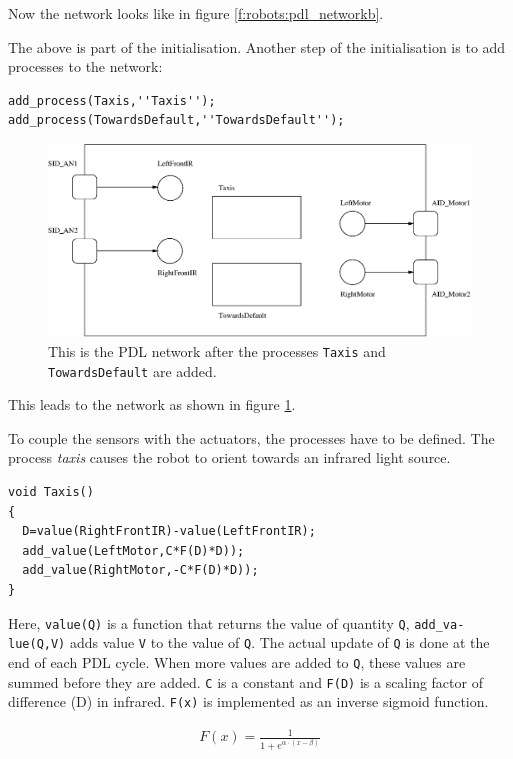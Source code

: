 Now the network looks like in figure \ref{f:robots:pdl_networkb}.

The above is part of the initialisation. Another step of the initialisation is to add processes to the network:


{\footnotesize\begin{verbatim}
add_process(Taxis,''Taxis'');
add_process(TowardsDefault,''TowardsDefault'');
\end{verbatim}}

\begin{figure}
\centerline{\includegraphics[width=12cm]{robots//pdl_networkc.eps}}
\caption{This is the PDL network after the processes \texttt{Taxis} and \texttt{TowardsDefault} are added.}
\label{f:robots:pdl_networkc}
\end{figure}


This leads to the network as shown in figure \ref{f:robots:pdl_networkc}. 

To couple the sensors with the actuators, the processes have to be defined. The process {\em taxis} causes the robot to orient towards an infrared light source.


{\footnotesize\begin{verbatim}
void Taxis()
{
  D=value(RightFrontIR)-value(LeftFrontIR);
  add_value(LeftMotor,C*F(D)*D));
  add_value(RightMotor,-C*F(D)*D));
}
\end{verbatim}}


Here, \texttt{value(Q)} is a function that returns the value of quantity \texttt{Q}, {\tt add\_va-lue(Q,V)} adds value \texttt{V} to the value of \texttt{Q}. The actual update of \texttt{Q} is done at the end of each PDL cycle. When more values are added to \texttt{Q}, these values are summed before they are added. \texttt{C} is a constant and \texttt{F(D)} is a scaling factor of difference (D) in infrared. \texttt{F(x)} is implemented as an inverse sigmoid function.

\begin{eqnarray*}
F(x)=\frac{1}{1+e^{\alpha \cdot (x - \beta)}}
\end{eqnarray*}

